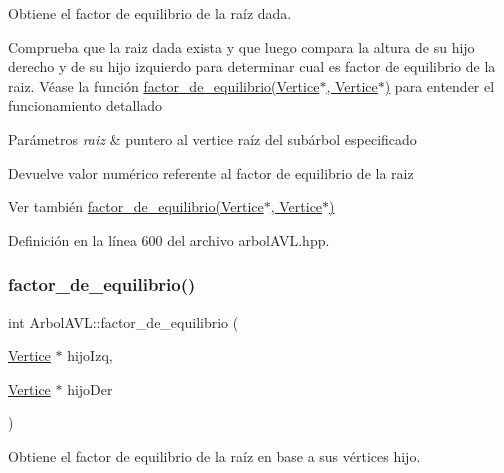 Obtiene el factor de equilibrio de la raíz dada. 

Comprueba que la raiz dada exista y que luego compara la altura de su hijo derecho y de su hijo izquierdo para determinar cual es factor de equilibrio de la raiz. Véase la función \hyperlink{classArbolAVL_a8cf229fd1482232fbfe4803043eeec14}{factor\+\_\+de\+\_\+equilibrio(\+Vertice$\ast$, Vertice$\ast$)} para entender el funcionamiento detallado 
\begin{DoxyParams}{Parámetros}
{\em raiz} & puntero al vertice raíz del subárbol especificado \\
\hline
\end{DoxyParams}
\begin{DoxyReturn}{Devuelve}
valor numérico referente al factor de equilibrio de la raiz 
\end{DoxyReturn}
\begin{DoxySeeAlso}{Ver también}
\hyperlink{classArbolAVL_a8cf229fd1482232fbfe4803043eeec14}{factor\+\_\+de\+\_\+equilibrio(\+Vertice$\ast$, Vertice$\ast$)} 
\end{DoxySeeAlso}


Definición en la línea 600 del archivo arbol\+A\+V\+L.\+hpp.

\mbox{\label{classArbolAVL_a8cf229fd1482232fbfe4803043eeec14}} 
\subsubsection{\texorpdfstring{factor\+\_\+de\+\_\+equilibrio()}{factor\_de\_equilibrio()}\hspace{0.1cm}{\footnotesize\ttfamily [2/2]}}
{\footnotesize\ttfamily int Arbol\+A\+V\+L\+::factor\+\_\+de\+\_\+equilibrio (\begin{DoxyParamCaption}\item[{\hyperlink{classVertice}{Vertice} $\ast$}]{hijo\+Izq,  }\item[{\hyperlink{classVertice}{Vertice} $\ast$}]{hijo\+Der }\end{DoxyParamCaption})\hspace{0.3cm}{\ttfamily [protected]}}



Obtiene el factor de equilibrio de la raíz en base a sus vértices hijo. 


